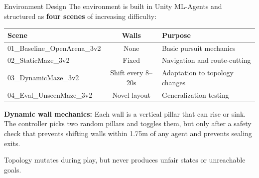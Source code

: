 \documentclass[aspectratio=169,11pt]{beamer}
\begin{document}
\begin{frame}{Environment Design}
The environment is built in Unity ML-Agents and structured as \textbf{four scenes} of increasing difficulty:

\vspace{4pt}
\begin{center}
\begin{tabular}{@{}lcl@{}}
\toprule
\textbf{Scene} & \textbf{Walls} & \textbf{Purpose} \\
\midrule
01\_Baseline\_OpenArena\_3v2 & None & Basic pursuit mechanics \\
02\_StaticMaze\_3v2 & Fixed & Navigation and route-cutting \\
03\_DynamicMaze\_3v2 & Shift every 8--20s & Adaptation to topology changes \\
04\_Eval\_UnseenMaze\_3v2 & Novel layout & Generalization testing \\
\bottomrule
\end{tabular}
\end{center}

\vspace{6pt}
\textbf{Dynamic wall mechanics:} Each wall is a vertical pillar that can rise or sink. The controller picks two random pillars and toggles them, but only after a safety check that prevents shifting walls within 1.75m of any agent and prevents sealing exits.

\vspace{4pt}
Topology mutates during play, but never produces unfair states or unreachable goals.
\end{frame}
\end{document}
